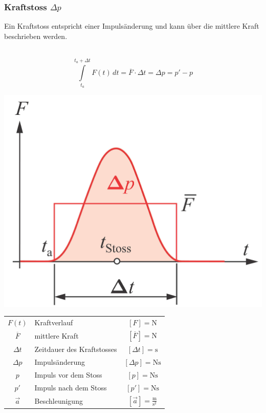		\subsubsection{Kraftstoss $\Delta p$}
			Ein Kraftstoss entspricht einer Impulsänderung und kann über die mittlere Kraft beschrieben werden. \\
			\\
			\begin{minipage}{0.55\linewidth}
				$$ \boxed{ \int \limits_{t_a}^{t_a + \Delta t}  F(t) \, dt = \overline{F} \cdot \Delta t = \Delta p = p' - p } $$ 	
			\end{minipage}
			\hfill
			\begin{minipage}{0.42\linewidth}
				\includegraphics[width=0.8\linewidth]{Bilder/impuls} \\
			\end{minipage}
			
			\begin{tabular}{c l c}
				$F(t)$ & Kraftverlauf & $[F] = \mathrm{N}$ \\
				$\overline{F}$ & mittlere Kraft & $[\overline{F}] = \mathrm{N}$ \\
				$\Delta t$ & Zeitdauer des Kraftstosses & $[\Delta t] = \mathrm{s}$ \\
				$\Delta p$ & Impulsänderung & $[\Delta p] = \mathrm{Ns}$ \\
				$p$ & Impuls vor dem Stoss & $[p] = \mathrm{Ns}$ \\
				$p'$ & Impuls nach dem Stoss & $[p'] = \mathrm{Ns}$ \\
				$\vec{a}$ & Beschleunigung & $[\vec{a}] = \mathrm{\frac{m}{s^2}}$ \\
			\end{tabular}

